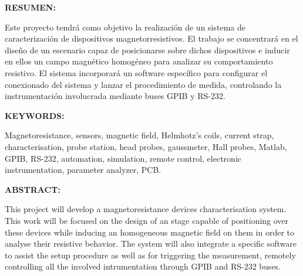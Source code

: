 \begin{doublespace}
\noindent \textbf{RESUMEN:}
\end{doublespace}

\begin{singlespace}

\noindent Este proyecto tendrá como objetivo la realización de un sistema de caracterización de dispositivos magnetorresistivos. El trabajo se concentrará en el diseño de un escenario capaz de posicionarse sobre dichos dispositivos e inducir en ellos un campo magnético homogéneo para analizar su comportamiento resistivo. El sistema incorporará un software específico para configurar el conexionado del sistema y lanzar el procedimiento de medida, controlando la instrumentación involucrada mediante buses GPIB y RS-232.
\end{singlespace}

\vspace{1.25cm}


\begin{doublespace}
\noindent \textbf{KEYWORDS:}
\end{doublespace}

\begin{singlespace}
\noindent Magnetoresistance, sensors, magnetic field, Helmhotz's coils, current strap, characterisation, probe station, head probes, gaussmeter, Hall probes, Matlab, GPIB, RS-232, automation, simulation, remote control, electronic instrumentation, parameter analyzer, PCB.
\end{singlespace}

\begin{doublespace}
\noindent \textbf{ABSTRACT:}
\end{doublespace}

\begin{singlespace}
\noindent This project will develop a magnetoresistance devices characterisation system. This work will be focused on the design of an stage capable of positioning over these devices while inducing an homogeneous magnetic field on them in order to analyse their resistive behavior. The system will also integrate a specific software to assist the setup procedure as well as for triggering the measurement, remotely controlling all the involved intrumentation through GPIB and RS-232 buses. 
\end{singlespace}


